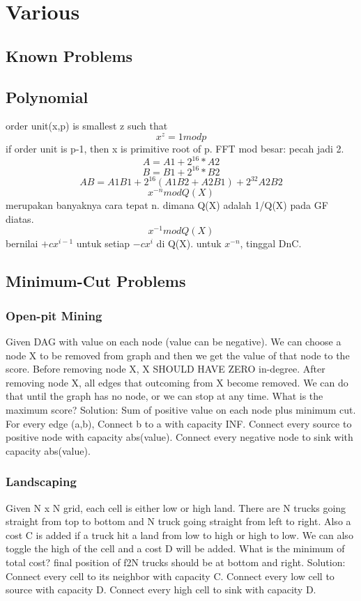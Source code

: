 \chapter{Various}

\section{Known Problems}

\section{Polynomial}
order unit(x,p) is smallest z such that
\[ x^z = 1 mod p \]
if order unit is p-1, then x is primitive root of p. \newline
FFT mod besar: pecah jadi 2.
\[ A = A1 + 2^{16}*A2 \]
\[ B = B1 + 2^{16}*B2 \]
\[ AB = A1B1 + 2^{16}(A1B2 + A2B1) + 2^{32}A2B2 \]
\[x^{-n} mod Q(X)\] merupakan banyaknya cara tepat n. dimana Q(X) adalah 1/Q(X) pada GF diatas.
\[x^{-1} mod Q(X)\] bernilai $+cx^{i-1}$ untuk setiap $-cx^{i}$ di Q(X). untuk $x^{-n}$, tinggal DnC.

\section{Minimum-Cut Problems}
\subsection{Open-pit Mining}
Given DAG with value on each node (value can be negative). We can choose a node X to be removed from graph and then 
we get the value of that node to the score. Before removing node X, X SHOULD HAVE ZERO in-degree. After removing node X, all edges that outcoming from X become removed. We can do that until the graph has no node, or we can stop at any time.
What is the maximum score? Solution: Sum of positive value on each node plus minimum cut. For every edge (a,b), Connect b to a with capacity INF. Connect every source to positive node with capacity abs(value). Connect every negative node to sink with capacity abs(value).
\subsection{Landscaping}
Given N x N grid, each cell is either low or high land. There are N trucks going straight from top to bottom and N truck going straight from left to right.
Also a cost C is added if a truck hit a land from low to high or high to low. 
We can also toggle the high of the cell and a cost D will be added. 
What is the minimum of total cost? final position of f2N trucks should be at bottom and right. Solution: Connect every cell to its neighbor with capacity C. Connect every low cell to source with capacity D. Connect every high cell to sink with capacity D.

